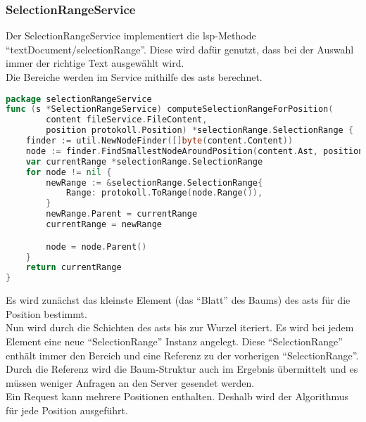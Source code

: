 \documentclass[./einleitung.tex]{subfiles}
\begin{document}
    \subsubsection[SelectionRangeService]{SelectionRangeService }\label{subsubsec:selection-service}
    Der SelectionRangeService implementiert die \acrshort{lsp}-Methode ``textDocument/selectionRange''.
    Diese wird dafür genutzt, dass bei der Auswahl immer der richtige Text ausgewählt wird. \\
    Die Bereiche werden im Service mithilfe des \acrshort{ast}s berechnet.
    \begin{lstlisting}[language=Go]
package selectionRangeService
func (s *SelectionRangeService) computeSelectionRangeForPosition(
        content fileService.FileContent,
        position protokoll.Position) *selectionRange.SelectionRange {
	finder := util.NewNodeFinder([]byte(content.Content))
	node := finder.FindSmallestNodeAroundPosition(content.Ast, position)
	var currentRange *selectionRange.SelectionRange
	for node != nil {
		newRange := &selectionRange.SelectionRange{
			Range: protokoll.ToRange(node.Range()),
		}
		newRange.Parent = currentRange
		currentRange = newRange

		node = node.Parent()
	}
	return currentRange
}
    \end{lstlisting}
    Es wird zunächst das kleinste Element (das ``Blatt'' des Baums) des \acrshort{ast}s für die Position bestimmt.\\
    Nun wird durch die Schichten des \acrshort{ast}s bis zur Wurzel iteriert.
    Es wird bei jedem Element eine neue ``SelectionRange'' Instanz angelegt.
    Diese ``SelectionRange'' enthält immer den Bereich und eine Referenz zu der vorherigen ``SelectionRange''.
    Durch die Referenz wird die Baum-Struktur auch im Ergebnis übermittelt und es müssen weniger Anfragen an den Server gesendet werden.\\

    Ein Request kann mehrere Positionen enthalten.
    Deshalb wird der Algorithmus für jede Position ausgeführt.
\end{document}
